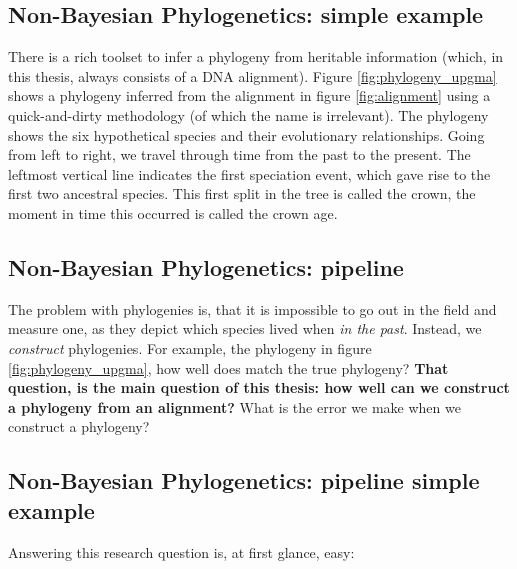 \subsection{Non-Bayesian Phylogenetics: simple example}

There is a rich toolset to infer a phylogeny from heritable 
information (which, in this thesis, always consists of a DNA alignment).
Figure \ref{fig:phylogeny_upgma} shows a phylogeny inferred
from the alignment 
in figure \ref{fig:alignment} using a quick-and-dirty methodology (of
which the name is irrelevant).
The phylogeny shows the six hypothetical species and their evolutionary 
relationships. Going from left to right, we travel through time from 
the past to the present. 
The leftmost vertical line indicates the first speciation event, 
which gave rise to the first two ancestral species. 
This first split in the tree is called the crown,
the moment in time this occurred is called the crown age.

\subsection{Non-Bayesian Phylogenetics: pipeline}

The problem with phylogenies is, 
that it is impossible to go out in the field and measure one, 
as they depict which species lived when \emph{in the past}.
Instead, we \emph{construct} phylogenies. For example,
the phylogeny in figure \ref{fig:phylogeny_upgma}, how well
does match the true phylogeny? \textbf{That question, is the main question of this 
thesis: how well can we construct a
phylogeny from an alignment?} What is the error we
make when we construct a phylogeny?

\subsection{Non-Bayesian Phylogenetics: pipeline simple example}

Answering this research question is, at first glance, easy: 

